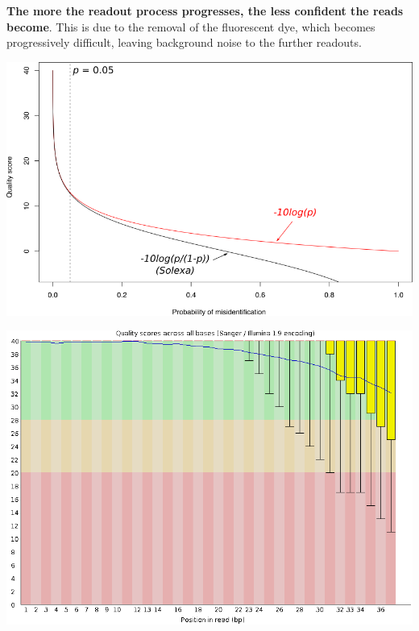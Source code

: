 \documentclass[x11names, svgnames]{beamer}
\begin{document}
\begin{frame}
  \frametitle{\three}
  \textbf{The more the readout process progresses, the less confident the reads become}. This is due to the removal of the fluorescent dye, which becomes progressively difficult, leaving background noise to the further readouts.\newline
  \vspace{2em}
  \begin{minipage}{0.45\textwidth}
    \hspace*{-1.2em}
    \includegraphics[scale=0.22]{images/quality_score}
  \end{minipage}
  \begin{minipage}{0.50\textwidth}
    \hspace*{1.3em}
    \includegraphics[scale=0.2]{images/per_base_sequence_quality_good}
  \end{minipage}
\end{frame}
\end{document}

